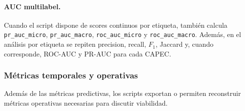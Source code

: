 \documentclass[12pt,oneside]{report}
\begin{document}
\paragraph{AUC multilabel.}
Cuando el script dispone de scores continuos por etiqueta, también calcula \texttt{pr\_auc\_micro}, \texttt{pr\_auc\_macro}, \texttt{roc\_auc\_micro} y \texttt{roc\_auc\_macro}. Además, en el análisis por etiqueta se repiten precision, recall, $F_1$, Jaccard y, cuando corresponde, ROC-AUC y PR-AUC para cada CAPEC.

\subsubsection{Métricas temporales y operativas}
Además de las métricas predictivas, los scripts exportan o permiten reconstruir métricas operativas necesarias para discutir viabilidad.
\end{document}
